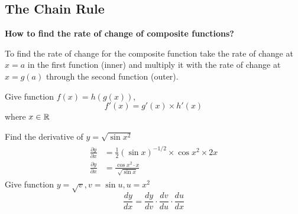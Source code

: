 \subsection{The Chain Rule}
\textbf{How to find the rate of change of composite functions?}
\begin{center}
    To find the rate of change for the composite function take the rate of change at $x = a$ in the first function (inner) and multiply it with the rate of change 
    at $x = g(a)$ through the second function (outer).
\end{center}

\begin{definition}
     Give function $f(x) = h(g(x))$, $$f'(x) = g'(x) \times h'(x)$$
    where $x \in \mathbb{R}$
\end{definition}

\begin{example}
    Find the derivative of $y = \sqrt{\sin x^2}$\\
    \begin{gather}
        \begin{align}
            \frac{\partial y}{\partial x} &= \frac{1}{2}(\sin x)^{-1/2} \times \cos x^2 \times 2x \\
            \frac{\partial y}{\partial x} &= \frac{\cos x^2 \cdot x}{\sqrt{\sin x}}
        \end{align}
    \end{gather}
    Give function $y = \sqrt{v}, v = \sin u, u = x^2$
    $$\frac{dy}{dx} = \frac{dy}{dv} \cdot \frac{dv}{du} \cdot \frac{du}{dx}$$
\end{example}
